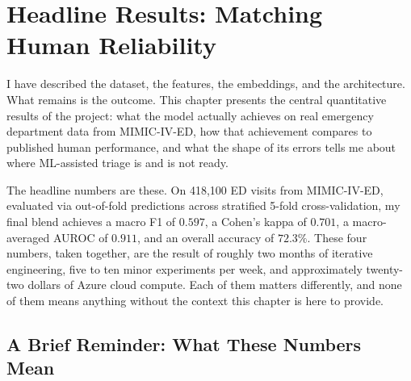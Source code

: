 
\chapter{Headline Results: Matching Human Reliability}
\label{ch:results}

I have described the dataset, the features, the embeddings, and the architecture. What remains is the outcome. This chapter presents the central quantitative results of the project: what the model actually achieves on real emergency department data from MIMIC-IV-ED, how that achievement compares to published human performance, and what the shape of its errors tells me about where ML-assisted triage is and is not ready.

The headline numbers are these. On 418,100 ED visits from MIMIC-IV-ED, evaluated via out-of-fold predictions across stratified 5-fold cross-validation, my final blend achieves a macro F1 of $0.597$, a Cohen's kappa of $0.701$, a macro-averaged AUROC of $0.911$, and an overall accuracy of $72.3\%$. These four numbers, taken together, are the result of roughly two months of iterative engineering, five to ten minor experiments per week, and approximately twenty-two dollars of Azure cloud compute. Each of them matters differently, and none of them means anything without the context this chapter is here to provide.

\section{A Brief Reminder: What These Numbers Mean}

